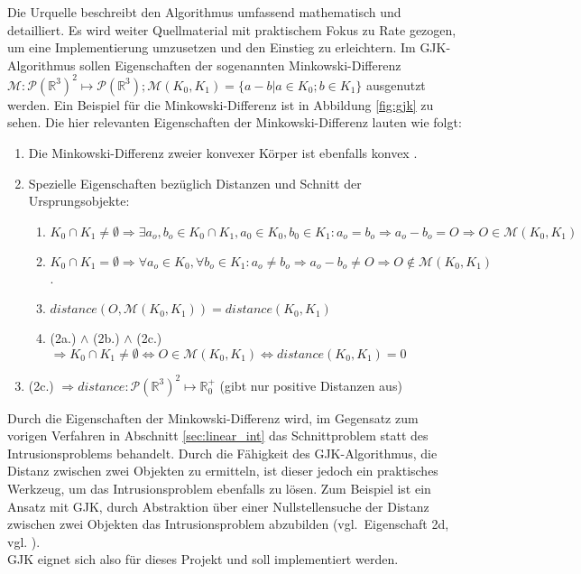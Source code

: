 Die Urquelle \cite{gjk} beschreibt den Algorithmus umfassend mathematisch und detailliert. Es wird weiter Quellmaterial \cite{gjk-casey} mit praktischem Fokus zu Rate gezogen, um eine Implementierung umzusetzen und den Einstieg zu erleichtern.
Im GJK-Algorithmus sollen Eigenschaften der sogenannten Minkowski-Differenz $\mathcal{M}:\mathcal{P}(\mathbb{R}^3)^2\mapsto \mathcal{P}(\mathbb{R}^3); \mathcal{M}(K_0, K_1) = \{a - b| a\in K_0 ; b\in K_1\}$ \cite[p.195]{gjk} ausgenutzt werden.
Ein Beispiel für die Minkowski-Differenz ist in Abbildung \ref{fig:gjk} zu sehen. Die hier relevanten Eigenschaften der Minkowski-Differenz lauten wie folgt:\\
	\begin{enumerate}
		\item Die Minkowski-Differenz zweier konvexer Körper ist ebenfalls konvex \cite[p.195]{gjk}.
		\item Spezielle Eigenschaften bezüglich Distanzen und Schnitt der Ursprungsobjekte:
		\begin{enumerate}
			\item $K_0 \cap K_1 \neq \emptyset \Rightarrow \exists a_o, b_o \in K_0 \cap K_1, a_0 \in K_0, b_0 \in K_1 : a_o = b_o \Rightarrow a_o - b_o = O \Rightarrow O \in \mathcal{M}(K_0, K_1)$
			\item $K_0 \cap K_1 = \emptyset \Rightarrow \forall a_o\in K_0, \forall b_o\in K_1 : a_o \neq b_o \Rightarrow a_o - b_o \neq O \Rightarrow O \notin \mathcal{M}(K_0, K_1)$.
			\item $distance(O, \mathcal{M}(K_0, K_1)) = distance(K_0, K_1)$
			\item (2a.) $\wedge$ (2b.) $\wedge$ (2c.) $\Rightarrow K_0 \cap K_1 \neq \emptyset \Leftrightarrow O \in \mathcal{M}(K_0, K_1)	\Leftrightarrow distance(K_0, K_1) = 0$
		\end{enumerate}
		\item (2c.) $\Rightarrow distance: \mathcal{P}(\mathbb{R}^3)^2 \mapsto \mathbb{R}^+_0$ (gibt nur positive Distanzen aus)
	\end{enumerate}
Durch die Eigenschaften der Minkowski-Differenz wird, im Gegensatz zum vorigen Verfahren in Abschnitt \ref{sec:linear_int} das Schnittproblem statt des Intrusionsproblems behandelt.
Durch die Fähigkeit des GJK-Algorithmus, die Distanz zwischen zwei Objekten zu ermitteln, ist dieser jedoch ein praktisches Werkzeug, um das Intrusionsproblem ebenfalls zu lösen.
Zum Beispiel ist ein Ansatz mit GJK, durch Abstraktion über einer Nullstellensuche der Distanz zwischen zwei Objekten das Intrusionsproblem abzubilden (vgl.~Eigenschaft 2d, vgl. \cite{gdc-physics}).\\
GJK eignet sich also für dieses Projekt und soll implementiert werden. 

